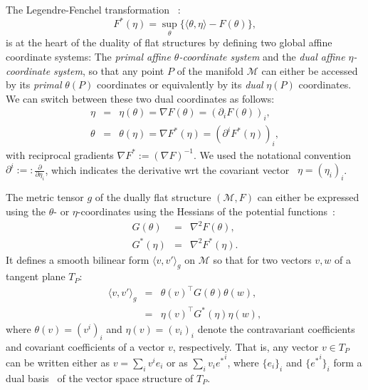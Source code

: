 \documentclass[graybox]{svmult}
\def\inner#1#2{{\langle #1,#2\rangle}}
\def\eqdef{:=}
\def\eqnota{:=:}
\def\calM{\mathcal{M}}
\begin{document}
The Legendre-Fenchel transformation~\cite{LegendreIG-2010} :
\begin{equation}
F^*(\eta)= \sup_\theta \{ \inner{\theta}{\eta}-F(\theta) \},
\end{equation} 
is at the heart of the duality of  flat structures by defining two global affine coordinate systems: The {\em primal affine $\theta$-coordinate system} and the {\em dual affine $\eta$-coordinate system}, so that any point $P$ of the manifold $\calM$ can  either be accessed by its {\em primal} $\theta(P)$ coordinates or equivalently by its {\em dual} $\eta(P)$ coordinates. 
We can switch between  these two dual coordinates as follows:
\begin{eqnarray}
 \eta&=&\eta(\theta)=\nabla F(\theta)=(\partial_i F(\theta))_i,\\
  \theta&=&\theta(\eta)=\nabla F^*(\eta)=(\partial^i F^*(\eta))_i,
	\end{eqnarray}
	with reciprocal gradients $\nabla F^* \eqdef (\nabla F)^{-1}$. 
	We used the notational convention $\partial^i \eqnota
        \frac{\partial}{\partial \eta_i}$, which indicates the
        derivative wrt the covariant vector~\cite{tensor-2011} $\eta=(\eta_i)_i$.


The metric tensor $g$ of the dually flat structure $(\calM,F)$  can either be expressed using the $\theta$- or $\eta$-coordinates using the Hessians of the potential functions~\cite{HIG-2007}:
\begin{eqnarray}
G(\theta)&=&\nabla^2 F(\theta),\\
G^*(\eta)&=&\nabla^2 F^* (\eta).
\end{eqnarray}
It defines a smooth bilinear form ${\inner{v}{v'}}_g$ on $\calM$ so that for two vectors $v,w$ of a tangent plane $T_P$:
\begin{eqnarray}
{\inner{v}{v'}}_g &=& \theta(v)^\top G(\theta) \theta(w),\\
 &=& \eta(v)^\top G^*(\eta) \eta(w),
\end{eqnarray}
where $\theta(v)=(v^i)_i$ and $\eta(v)=(v_i)_i$ denote the contravariant coefficients and covariant coefficients of a vector $v$, respectively.
That is,  any vector $v\in T_P$ can be written either as $v=\sum_i v^ie_i$ or as $\sum_i v_i{e^*}^i$, where  $\{e_i\}_i$ and
 $\{{e^*}^i\}_i$ form a dual basis~\cite{tensor-2011} of the vector space structure of $T_P$.
\end{document}
